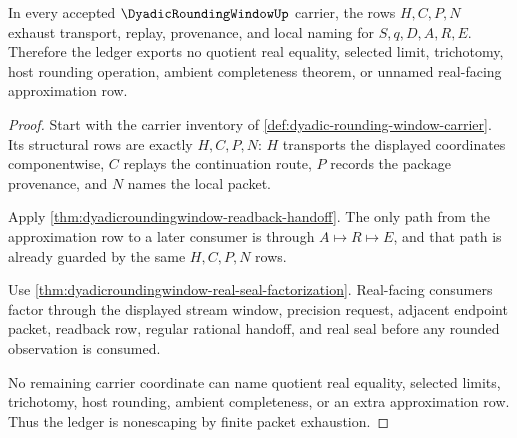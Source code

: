 \begin{theorem}
\label{thm:dyadicroundingwindow-ledger-nonescape}
In every accepted $\DyadicRoundingWindowUp$ carrier, the rows $H,C,P,N$ exhaust transport, replay, provenance, and local naming for $S,q,D,A,R,E$. Therefore the ledger exports no quotient real equality, selected limit, trichotomy, host rounding operation, ambient completeness theorem, or unnamed real-facing approximation row.
\end{theorem}
\begin{proof}
Start with the carrier inventory of \autoref{def:dyadic-rounding-window-carrier}. Its structural rows are exactly $H,C,P,N$: $H$ transports the displayed coordinates componentwise, $C$ replays the continuation route, $P$ records the package provenance, and $N$ names the local packet.

Apply \autoref{thm:dyadicroundingwindow-readback-handoff}. The only path from the approximation row to a later consumer is through $A\mapsto R\mapsto E$, and that path is already guarded by the same $H,C,P,N$ rows.

Use \autoref{thm:dyadicroundingwindow-real-seal-factorization}. Real-facing consumers factor through the displayed stream window, precision request, adjacent endpoint packet, readback row, regular rational handoff, and real seal before any rounded observation is consumed.

No remaining carrier coordinate can name quotient real equality, selected limits, trichotomy, host rounding, ambient completeness, or an extra approximation row. Thus the ledger is nonescaping by finite packet exhaustion.
\end{proof}

